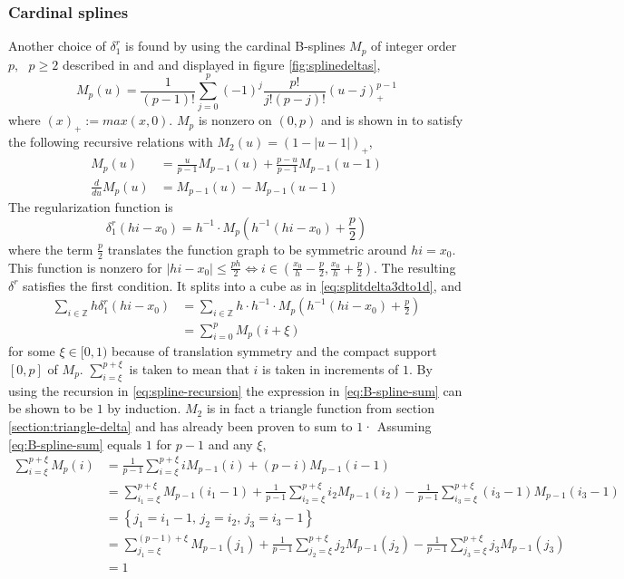 \documentclass[a4paper,
twoside=false,abstract=false,numbers=noenddot,
titlepage=false,headings=small,parskip=half,version=last]{scrartcl}
\begin{document}
\subsubsection{Cardinal splines}
Another choice of $\delta^r_1$ is found by using the cardinal B-splines $M_p$ of integer order $p,\text{ }p\geq2$ described in \cite{B-spline-paper} and \cite{spectralewald} and displayed in figure \ref{fig:splinedeltas},
\begin{equation}
M_p(u) = \frac{1}{(p-1)!} \sum^p_{j=0} (-1)^j \frac{p!}{j!(p-j)!}(u-j)^{p-1}_+\label{eq:cardinalspline-definition}
\end{equation}
where $(x)_+ := max(x,0)$.
$M_p$ is nonzero on $(0,p)$ and is shown in \cite{B-spline-paper} to satisfy the following recursive relations with $M_2(u) = (1-|u-1|)_+$,
\begin{align}
M_p(u) &= \frac{u}{p-1}M_{p-1}(u) + \frac{p-u}{p-1}M_{p-1}(u-1)\label{eq:spline-recursion}\\
\frac{d}{du}M_p(u) &= M_{p-1}(u) - M_{p-1}(u-1)\label{eq:spline-derivative-recursion}
\end{align}
The regularization function is
\begin{equation}
\delta^r_1(hi-x_0) = h^{-1}\cdot M_p(h^{-1}(hi-x_0)+\frac{p}{2})\nonumber
\end{equation}
where the term $\frac{p}{2}$ translates the function graph to be symmetric around $hi=x_0$.
This function is nonzero for $|hi-x_0| \leq \frac{ph}{2} \Leftrightarrow i \in (\frac{x_0}{h}-\frac{p}{2},\frac{x_0}{h}+\frac{p}{2})$.
The resulting $\delta^r$ satisfies the first condition. It splits into a cube as in \eqref{eq:splitdelta3dto1d}, and
\begin{align}
\sum_{i\in \mathbb{Z}}h\delta^{r}_1(hi-x_0) &= \sum_{i\in \mathbb{Z}} h\cdot h^{-1} \cdot M_p(h^{-1}(hi-x_0)+\frac{p}{2})\nonumber\\
		&= \sum_{i=0}^{p} M_p(i+\xi)\label{eq:B-spline-sum}
\end{align}
for some $\xi\in[0,1)$ because of translation symmetry and the compact support $[0,p]$ of $M_p$. $\sum_{i=\xi}^{p+\xi}$ is taken to mean that $i$ is taken in increments of $1$. By using the recursion in \eqref{eq:spline-recursion} the expression in \eqref{eq:B-spline-sum} can be shown to be $1$ by induction.
$M_2$ is in fact a triangle function from section \ref{section:triangle-delta} and has already been proven to sum to $1$· Assuming \eqref{eq:B-spline-sum} equals $1$ for $p-1$ and any $\xi$,
\begin{align}
\sum_{i=\xi}^{p+\xi} M_p(i) &= \frac{1}{p-1}\sum_{i=\xi}^{p+\xi} iM_{p-1}(i) + (p-i)M_{p-1}(i-1)\nonumber\\
		&= \sum_{i_1=\xi}^{p+\xi} M_{p-1}(i_1-1) + \frac{1}{p-1}\sum_{i_2=\xi}^{p+\xi} i_2M_{p-1}(i_2) - \frac{1}{p-1}\sum_{i_3=\xi}^{p+\xi} (i_3-1)M_{p-1}(i_3-1)\nonumber\\
		&= \left\{ j_1 = i_1-1\text{, } j_2 = i_2\text{, }j_3 = i_3-1\right\}\nonumber\\
		&= \sum_{j_1=\xi}^{(p-1)+\xi} M_{p-1}(j_1) + \frac{1}{p-1}\sum_{j_2=\xi}^{p+\xi} j_2M_{p-1}(j_2) - \frac{1}{p-1}\sum_{j_3=\xi}^{p+\xi} j_3M_{p-1}(j_3)\nonumber\\
		&= 1\nonumber
\end{align}
\end{document}
